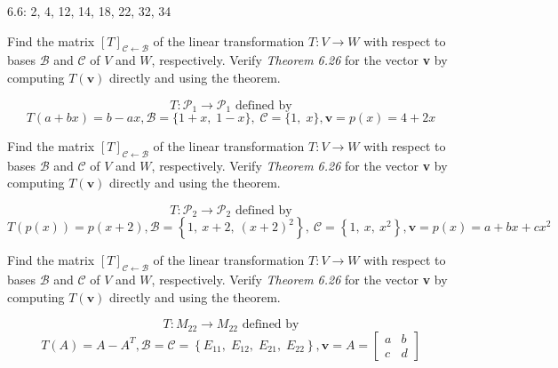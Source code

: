 \documentclass[11pt,letterpaper,boxed]{pset}
\begin{document}
    \begin{center}
         6.6: 2, 4, 12, 14, 18, 22, 32, 34
    \end{center}
    
    \begin{problem} [6.6 \#2]
    Find the matrix $[T]_{\mathscr{C}\xleftarrow{}\mathscr{B}}$ of the linear transformation $T: V \xrightarrow{} W $ with respect to bases $\mathscr{B}$ and $\mathscr{C}$ of $V$ and $W$, respectively. Verify \textit{Theorem 6.26} for the vector \textbf{v} by computing $T(\textbf{v})$ directly and using the theorem.
    
    \[T: \mathscr{P}_1 \xrightarrow{} \mathscr{P}_1 \text{ defined by} \]
    \[T(a+bx) = b- a x, \mathscr{B}=\{1+x,\; 1-x\},\; \mathscr{C}=\{1,\; x\}, \textbf{v}=p(x)=4+2x\]
    
    \end{problem}
    \newpage
    
    \begin{problem} [6.6 \#4]
    Find the matrix $[T]_{\mathscr{C}\xleftarrow{}\mathscr{B}}$ of the linear transformation $T: V \xrightarrow{} W $ with respect to bases $\mathscr{B}$ and $\mathscr{C}$ of $V$ and $W$, respectively. Verify \textit{Theorem 6.26} for the vector \textbf{v} by computing $T(\textbf{v})$ directly and using the theorem.
    
    \[T: \mathscr{P}_2 \xrightarrow{} \mathscr{P}_2 \text{ defined by}\] 
    \[T(p(x)) = p(x+2), \mathscr{B}=\left\{1,  \: x+2,  \: (x+2)^2\right\},  \: \mathscr{C}=\left\{1,  \: x,   \: x^2\right\}, \textbf{v}=p(x)=a+bx+cx^2\]
    
    \end{problem}
    \newpage
    
    
    \begin{problem} [6.6 \#12]
    Find the matrix $[T]_{\mathscr{C}\xleftarrow{}\mathscr{B}}$ of the linear transformation $T: V \xrightarrow{} W $ with respect to bases $\mathscr{B}$ and $\mathscr{C}$ of $V$ and $W$, respectively. Verify \textit{Theorem 6.26} for the vector \textbf{v} by computing $T(\textbf{v})$ directly and using the theorem.
    
    \[T: M_{22} \xrightarrow{} M_{22} \text{ defined by}\]
    \[T(A) = A - A^T, \mathscr{B}=\mathscr{C}=\left\{E_{11},\;E_{12},\;E_{21},\;E_{22}\right\}, \textbf{v}=A=\begin{bmatrix}a&b\\c&d\end{bmatrix} \]
    
    \end{problem}
    \newpage
    
\end{document}
